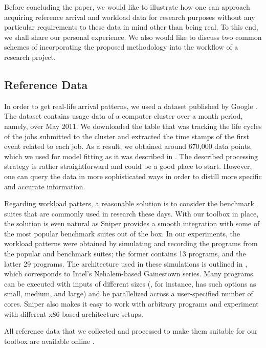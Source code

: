 Before concluding the paper, we would like to illustrate how one can approach
acquiring reference arrival and workload data for research purposes without any
particular requirements to these data in mind other than being real. To this
end, we shall share our personal experience. We also would like to discuss two
common schemes of incorporating the proposed methodology into the workflow of a
research project.

\subsection{Reference Data}

In order to get real-life arrival patterns, we used a dataset published by
Google \cite{google}. The dataset contains usage data of a computer cluster over
a month period, namely, over May 2011. We downloaded the table that was tracking
the life cycles of the jobs submitted to the cluster and extracted the time
stamps of the first event related to each job. As a result, we obtained around
670,000 data points, which we used for model fitting as it was described in
. The described processing strategy is rather straightforward and
could be a good place to start. However, one can query the data in more
sophisticated ways in order to distill more specific and accurate information.

Regarding workload patters, a reasonable solution is to consider the benchmark
suites that are commonly used in research these days. With our toolbox in place,
the solution is even natural as Sniper provides a smooth integration with some
of the most popular benchmark suites out of the box. In our experiments, the
workload patterns were obtained by simulating and recording the programs from
the popular  \cite{bienia2011} and  \cite{cpu2006}
benchmark suites; the former contains 13 programs, and the latter 29 programs.
The architecture used in these simulations is outlined in , which
corresponds to Intel's Nehalem-based Gainestown series. Many programs can be
executed with inputs of different sizes (, for instance, has such
options as small, medium, and large) and be parallelized across a user-specified
number of cores. Sniper also makes it easy to work with arbitrary programs and
experiment with different x86-based architecture setups.

All reference data that we collected and processed to make them suitable for our
toolbox are available online \cite{sources}.

